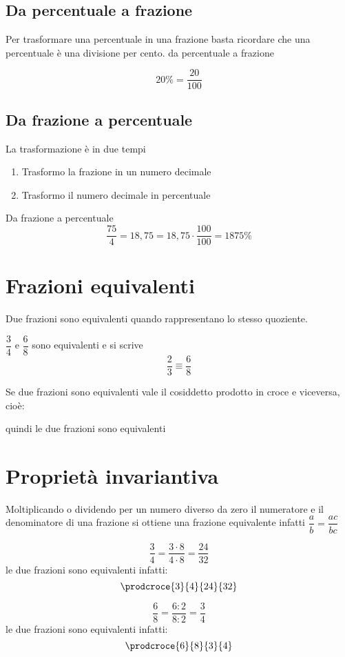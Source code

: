 \subsection{Da percentuale a frazione}
Per trasformare una percentuale in una frazione basta ricordare che una percentuale è una divisione per cento.
da percentuale a frazione
\begin{esempio}
\[20\%=\dfrac{20}{100} \]
\end{esempio}
\subsection{Da frazione a percentuale}
La trasformazione è in due tempi 
\begin{enumerate}
	\item Trasformo la frazione in un numero decimale
	\item Trasformo il numero decimale in percentuale
\end{enumerate}
\begin{esempio}
Da frazione a percentuale
\[\dfrac{75}{4}=18,75=18,75\cdot\dfrac{100}{100}=1875\% \]
\end{esempio} 
\section{Frazioni equivalenti}
\label{sec:FrazioniEquivalentiNumRazzASS}
Due frazioni sono equivalenti quando rappresentano lo stesso quoziente.
\begin{esempio}
$\dfrac{3}{4}$ e $\dfrac{6}{8}$ sono equivalenti e  si scrive \[\dfrac{2}{3} \equiv\dfrac{6}{8}\]
\end{esempio}
Se due frazioni sono equivalenti vale il cosiddetto prodotto in croce e viceversa, cioè:
\begin{center}
\end{center}
\begin{esempio}
\begin{center}
\end{center}
quindi le due frazioni sono equivalenti
\end{esempio}
%
\section{Proprietà  invariantiva}
\label{sec:propInvariantivaNumASS}

Moltiplicando o dividendo per un numero diverso da zero il numeratore e il denominatore di una frazione si ottiene una frazione equivalente 
infatti $\dfrac{a}{b}=\dfrac{ac}{bc}$
\begin{center}
\end{center}
\begin{esempio}
\[\dfrac{3}{4}=\dfrac{3\cdot 8}{4\cdot 8}=\dfrac{24}{32}\]   le due frazioni sono equivalenti infatti: \[\prodcroce{3}{4}{24}{32}\]
\end{esempio}
\begin{esempio}
\[\dfrac{6}{8}=\dfrac{6:2}{8:2}=\dfrac{3}{4}\]   le due frazioni sono equivalenti infatti: 
\[\prodcroce{6}{8}{3}{4}\]
\end{esempio}
